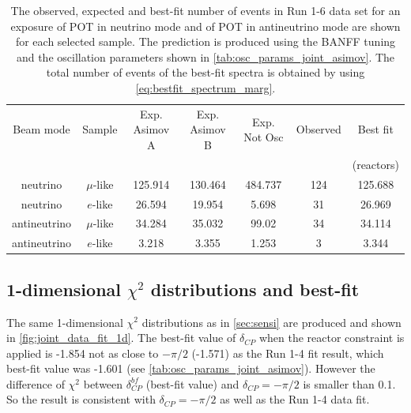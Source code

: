 \begin{table}[htb]
\centering
\begin{tabular}{| c | c | c | c | c | c | c |}
\hline
Beam mode	& Sample		& Exp. Asimov A  	& Exp. Asimov B	& Exp. Not Osc			& Observed 	& Best fit\\
			& 			& 			  	& 				& 					& 		 	& (reactors)\\
\hline
neutrino	 	& $\mu$-like 	& 125.914			& 130.464 		& 484.737				& 124 		& 125.688 \\
neutrino 		& $e$-like  	& 26.594			& 19.954			& 5.698				& 31 			& 26.969 \\
antineutrino 	& $\mu$-like 	& 34.284			& 35.032			& 99.02				& 34 			& 34.114 \\
antineutrino 	& $e$-like 	& 3.218			& 3.355			& 1.253				& 3 			& 3.344 \\
\hline
\end{tabular}
\caption{
The observed, expected and best-fit number of events in Run 1-6 data set
for an exposure
of \TotalPotNu POT in neutrino mode
and
of \TotalPotNuBar POT in antineutrino mode
are shown 
for each selected sample.
The prediction is produced using the BANFF tuning
and the oscillation parameters shown in \cref{tab:osc_params_joint_asimov}.
The total number of events of the best-fit spectra is obtained by using \cref{eq:bestfit_spectrum_marg}.
}
\label{tab:num_events}
\end{table}


%
%

\subsection {1-dimensional $\chi^2$ distributions and best-fit}
\label{sec:chisq_1d}



The same 1-dimensional $\chi^2$ distributions as in \cref{sec:sensi} are produced
and shown in \cref{fig:joint_data_fit_1d}.
The best-fit value of $\delta_{CP}$ when the reactor constraint is applied is -1.854
not as close to $-\pi/2$ (-1.571) as the Run 1-4 fit result, which best-fit value was -1.601 (see \cref{tab:osc_params_joint_asimov}).
However the difference of $\chi^2$ between $\delta_{CP}^{bf}$ (best-fit value) and $\delta_{CP}=-\pi/2$ is smaller than 0.1.
So the result is consistent with $\delta_{CP} = -\pi/2$ as well as the Run 1-4 data fit.
 

